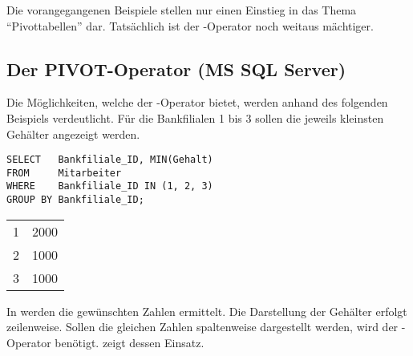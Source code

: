           Die vorangegangenen Beispiele stellen nur einen Einstieg in das Thema \enquote{Pivottabellen} dar. Tats\"achlich ist der -Operator noch weitaus m\"achtiger.
      \subsection{Der PIVOT-Operator (MS SQL Server)}
        Die M\"oglichkeiten, welche der -Operator bietet, werden anhand des folgenden Beispiels verdeutlicht. F\"ur die Bankfilialen 1 bis 3 sollen die jeweils kleinsten Geh\"alter angezeigt werden.
        \begin{lstlisting}[language=ms_sql,caption={Die niedrigsten Geh\"alter in den Filialen 1 bis 3},label=sql06_22]
SELECT   Bankfiliale_ID, MIN(Gehalt)
FROM     Mitarbeiter
WHERE    Bankfiliale_ID IN (1, 2, 3)
GROUP BY Bankfiliale_ID;
        \end{lstlisting}
\clearpage
        \begin{center}
          \begin{small}
            \tablehead{}
            \begin{mssql}
              \begin{supertabular}{ll}
                1 & 2000 \\
                2 & 1000 \\
                3 & 1000 \\
              \end{supertabular}
            \end{mssql}
          \end{small}
        \end{center}
        In  werden die gew\"unschten Zahlen ermittelt. Die Darstellung der Geh\"alter erfolgt zeilenweise. Sollen die gleichen Zahlen spaltenweise dargestellt werden, wird der -Operator ben\"otigt.  zeigt dessen Einsatz.
